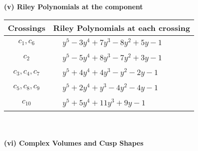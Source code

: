 \documentclass[1p]{elsarticle_modified}
\theoremstyle{definition}
\begin{document}
\newpage\renewcommand{\arraystretch}{1}
\flushleft \textbf{(v) Riley Polynomials at the component}\newline \\
\begin{tabular}{m{50pt}|m{274pt}}
Crossings & \hspace{64pt}Riley Polynomials at each crossing \\
\hline $$\begin{aligned}c_{1},c_{6}\end{aligned}$$&$\begin{aligned}
&y^5-3 y^4+7 y^3-8 y^2+5 y-1
\end{aligned}$\\
\hline $$\begin{aligned}c_{2}\end{aligned}$$&$\begin{aligned}
&y^5-5 y^4+8 y^3-7 y^2+3 y-1
\end{aligned}$\\
\hline $$\begin{aligned}c_{3},c_{4},c_{7}\end{aligned}$$&$\begin{aligned}
&y^5+4 y^4+4 y^3- y^2-2 y-1
\end{aligned}$\\
\hline $$\begin{aligned}c_{5},c_{8},c_{9}\end{aligned}$$&$\begin{aligned}
&y^5+2 y^4+y^3-4 y^2-4 y-1
\end{aligned}$\\
\hline $$\begin{aligned}c_{10}\end{aligned}$$&$\begin{aligned}
&y^5+5 y^4+11 y^3+9 y-1
\end{aligned}$\\
\hline
\end{tabular}\\~\\
\newpage\flushleft \textbf{(vi) Complex Volumes and Cusp Shapes}
\end{document}
